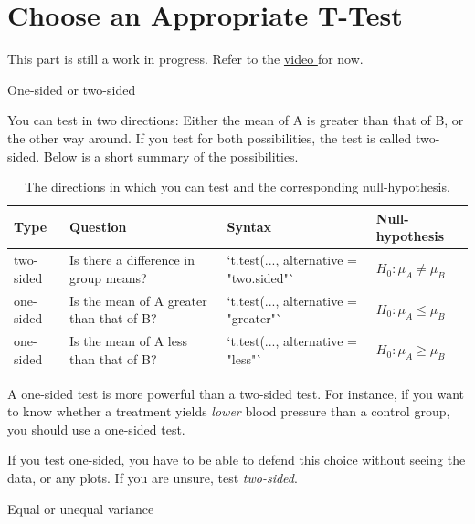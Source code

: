 \documentclass[
]{book}
\begin{document}
\hypertarget{choose-an-appropriate-t-test}{%
\section{Choose an Appropriate T-Test}\label{choose-an-appropriate-t-test}}

This part is still a work in progress. Refer to the \href{https://youtu.be/qJA3CvFt_pc}{video } for now.

One-sided or two-sided

You can test in two directions: Either the mean of A is greater than that of B, or the other way around. If you test for both possibilities, the test is called two-sided. Below is a short summary of the possibilities.

\begin{table}

\caption{\label{tab:unnamed-chunk-16}The directions in which you can test and the corresponding null-hypothesis.}
\centering
\fontsize{13}{15}\selectfont
\begin{tabular}[t]{l|l|l|l}
\hline
Type & Question & Syntax & Null-hypothesis\\
\hline
two-sided & Is there a difference in group means? & `t.test(..., alternative = "two.sided"` & $H_0: \mu_A \neq \mu_B$\\
\hline
one-sided & Is the mean of A greater than that of B? & `t.test(..., alternative = "greater"` & $H_0: \mu_A \leq \mu_B$\\
\hline
one-sided & Is the mean of A less than that of B? & `t.test(..., alternative = "less"` & $H_0: \mu_A \geq \mu_B$\\
\hline
\end{tabular}
\end{table}

A one-sided test is more powerful than a two-sided test. For instance, if you want to know whether a treatment yields \emph{lower} blood pressure than a control group, you should use a one-sided test.

If you test one-sided, you have to be able to defend this choice without seeing the data, or any plots. If you are unsure, test \emph{two-sided}.

Equal or unequal variance
\end{document}

